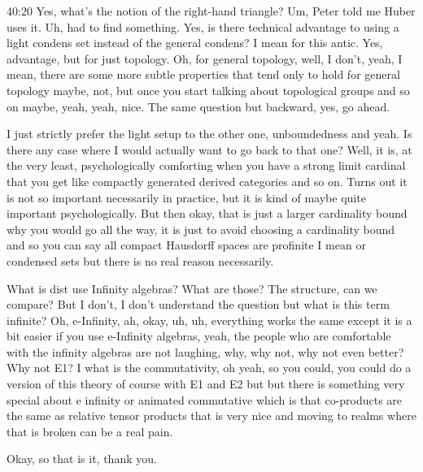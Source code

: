 \begin{unfinished}{40:20}
Yes, what's the notion of the right-hand triangle? Um, Peter told me Huber uses it. Uh, had to find something. Yes, is there technical advantage to using a light condens set instead of the general condens? I mean for this antic. Yes, advantage, but for just topology. Oh, for general topology, well, I don't, yeah, I mean, there are some more subtle properties that tend only to hold for general topology maybe, not, but once you start talking about topological groups and so on maybe, yeah, yeah, nice. The same question but backward, yes, go ahead.

I just strictly prefer the light setup to the other one, unboundedness and yeah. Is there any case where I would actually want to go back to that one? Well, it is, at the very least, psychologically comforting when you have a strong limit cardinal that you get like compactly generated derived categories and so on. Turns out it is not so important necessarily in practice, but it is kind of maybe quite important psychologically. But then okay, that is just a larger cardinality bound why you would go all the way, it is just to avoid choosing a cardinality bound and so you can say all compact Hausdorff spaces are profinite I mean or condensed sets but there is no real reason necessarily.

What is dist use Infinity algebras? What are those? The structure, can we compare? But I don't, I don't understand the question but what is this term infinite? Oh, e-Infinity, ah, okay, uh, uh, everything works the same except it is a bit easier if you use e-Infinity algebras, yeah, the people who are comfortable with the infinity algebras are not laughing, why, why not, why not even better? Why not E1? I what is the commutativity, oh yeah, so you could, you could do a version of this theory of course with E1 and E2 but but there is something very special about e infinity or animated commutative which is that co-products are the same as relative tensor products that is very nice and moving to realms where that is broken can be a real pain.

Okay, so that is it, thank you.
\end{unfinished}